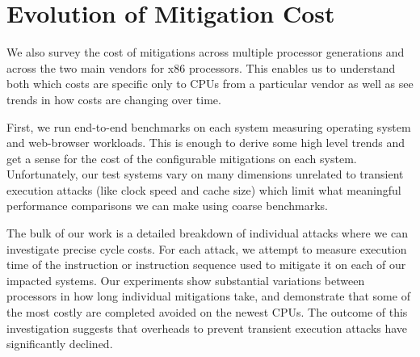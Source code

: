 \section*{Evolution of Mitigation Cost}
We also survey the cost of mitigations across multiple processor generations and across the two main vendors for x86 processors.
This enables us to understand both which costs are specific only to CPUs from a particular vendor as well as see trends in how costs are changing over time.

First, we run end-to-end benchmarks on each system measuring operating system and web-browser workloads.
This is enough to derive some high level trends and get a sense for the cost of the configurable mitigations on each system.
Unfortunately, our test systems vary on many dimensions unrelated to transient execution attacks (like clock speed and cache size) which limit what meaningful performance comparisons we can make using coarse benchmarks.

The bulk of our work is a detailed breakdown of individual attacks where we can investigate precise cycle costs.
For each attack, we attempt to measure execution time of the instruction or instruction sequence used to mitigate it on each of our impacted systems.
Our experiments show substantial variations between processors in how long individual mitigations take, and demonstrate that some of the most costly are completed avoided on the newest CPUs. 
The outcome of this investigation suggests that overheads to prevent transient execution attacks have significantly declined.
